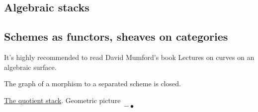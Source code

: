\documentclass[main.tex]{subfiles}
\begin{document}
\begin{example}

\end{example}

























\subsection{Algebraic stacks}
\subsection{Schemes as functors, sheaves on categories}
It's highly recommended to read David Mumford's book Lectures on curves on an algebraic surface. 
\begin{example}

\end{example}

\begin{example}

\end{example}

\begin{example}

\end{example}

\begin{example}[Grassmannian]

\end{example}
\begin{remark}
The graph of a morphism to a separated scheme is closed.
\end{remark}

\begin{example}
\href{https://mathoverflow.net/questions/184253/the-quotient-stack-mathbban-mathrmgl-n?rq=1}{The quotient stack}.
Geometric picture
$$-\bullet$$
\end{example}
\end{document}
